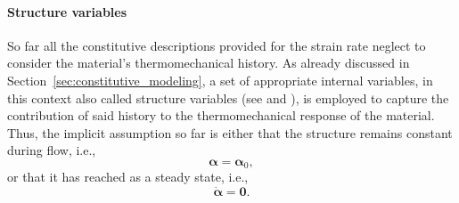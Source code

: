 
\paragraph{Structure variables}
So far all the constitutive descriptions provided for the strain rate neglect to consider the material's thermomechanical history.
As already discussed in Section~\ref{sec:constitutive_modeling}, a set of appropriate internal variables, in this context also called structure variables (see \cite{kocks1975thermodynamics} and \cite{frostDeformationmechanismMapsPlasticity1982}), is employed to capture the contribution of said history to the thermomechanical response of the material.
Thus, the implicit assumption so far is either that the structure remains constant during flow, i.e.,
\begin{equation}
  \bm \alpha = \bm \alpha_0,
\end{equation}
or that it has reached as a steady state, i.e.,
\begin{equation}
  \dot{\bm \alpha} = \bm 0.
\end{equation}

